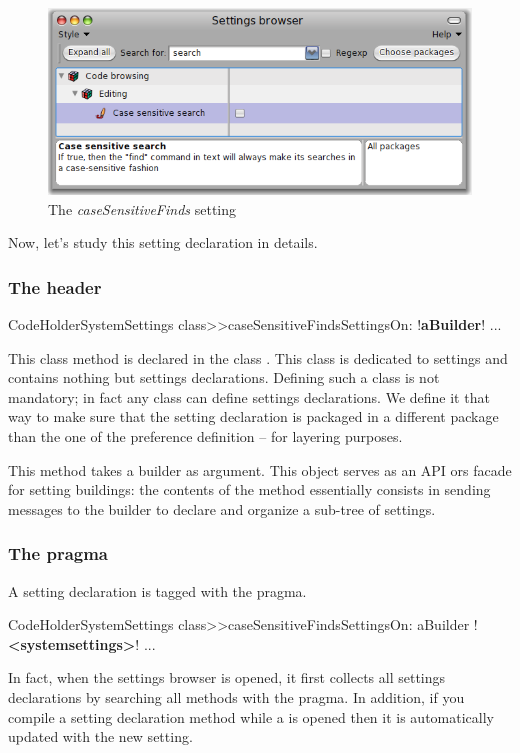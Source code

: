 \documentclass[a4paper,10pt,twoside]{book}
\begin{document}
\begin{figure}[tbh]
\begin{center}
\includegraphics[scale=0.4]{caseSensitiveFinds_setting_declaration1}
\caption{The \textit{caseSensitiveFinds} setting}
\end{center}
\end{figure}

Now, let's study this setting declaration in details. 

\subsubsection{The header}
\begin{code}{}
CodeHolderSystemSettings class>>caseSensitiveFindsSettingsOn: !\textbf{aBuilder}!
   ...
\end{code}
This class method is declared in the class . This class is dedicated to settings and contains nothing but settings declarations. Defining such a class is not mandatory; in fact any class can define settings declarations. We define it that way to make sure that the setting declaration is packaged in a different package than the one of the preference definition -- for layering purposes.

This method takes a builder as argument. This object serves as an API ors facade for setting buildings: the contents of the method essentially consists in sending messages to the builder to declare and organize a sub-tree of settings.

\subsubsection{The pragma}
A setting declaration is tagged with the  pragma.
\begin{code}{}
CodeHolderSystemSettings class>>caseSensitiveFindsSettingsOn: aBuilder
	!\textbf{<systemsettings>}!
   ...
\end{code}
In fact, when the settings browser is opened, it first collects all settings declarations by searching all methods with the  pragma. In addition, if you compile a setting declaration method while a \setbrowser is opened then it is automatically updated with the new setting. 
\end{document}
